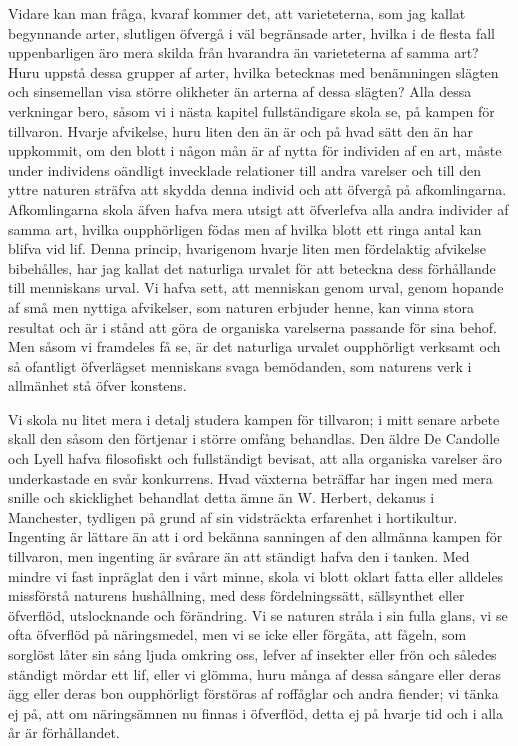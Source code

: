Vidare kan man fråga, kvaraf kommer det, att varieteterna, som jag kallat begynnande arter, slutligen öfvergå i väl begränsade arter, hvilka i de flesta fall uppenbarligen äro mera skilda från hvarandra än varieteterna af samma art? Huru uppstå dessa grupper af arter, hvilka betecknas med benämningen slägten och sinsemellan visa större olikheter än arterna af dessa slägten? Alla dessa verkningar bero, såsom vi i nästa kapitel fullständigare skola se, på kampen för tillvaron. Hvarje afvikelse, huru liten den än är och på hvad sätt den än har uppkommit, om den blott i någon mån är af nytta för individen af en art, måste under individens oändligt invecklade relationer till andra varelser och till den yttre naturen sträfva att skydda denna individ och att öfvergå på afkomlingarna. Afkomlingarna skola äfven hafva mera utsigt att öfverlefva alla andra individer af samma art, hvilka oupphörligen födas men af hvilka blott ett ringa antal kan blifva vid lif. Denna princip, hvarigenom hvarje liten men fördelaktig afvikelse bibehålles, har jag kallat det naturliga urvalet för att beteckna dess förhållande till menniskans urval. Vi hafva sett, att menniskan genom urval, genom hopande af små men nyttiga afvikelser, som naturen erbjuder henne, kan vinna stora resultat och är i stånd att göra de organiska varelserna passande för sina behof. Men såsom vi framdeles få se, är det naturliga urvalet oupphörligt verksamt och så ofantligt öfverlägset menniskans svaga bemödanden, som naturens verk i allmänhet stå öfver konstens.

Vi skola nu litet mera i detalj studera kampen för tillvaron; i mitt senare arbete skall den såsom den förtjenar i större omfång behandlas. Den äldre De Candolle och Lyell hafva filosofiskt och fullständigt bevisat, att alla organiska varelser äro underkastade en svår konkurrens. Hvad växterna beträffar har ingen med mera snille och skicklighet behandlat detta ämne än W. Herbert, dekanus i Manchester, tydligen på grund af sin vidsträckta erfarenhet i hortikultur. Ingenting är lättare än att i ord bekänna sanningen af den allmänna kampen för tillvaron, men ingenting är svårare än att ständigt hafva den i tanken. Med mindre vi fast inpräglat den i vårt minne, skola vi blott oklart fatta eller alldeles missförstå naturens hushållning, med dess fördelningssätt, sällsynthet eller öfverflöd, utslocknande och förändring. Vi se naturen stråla i sin fulla glans, vi se ofta öfverflöd på näringsmedel, men vi se icke eller förgäta, att fågeln, som sorglöst låter sin sång ljuda omkring oss, lefver af insekter eller frön och således ständigt mördar ett lif, eller vi glömma, huru många af dessa sångare eller deras ägg eller deras bon oupphörligt förstöras af roffåglar och andra fiender; vi tänka ej på, att om näringsämnen nu finnas i öfverflöd, detta ej på hvarje tid och i alla år är förhållandet.



